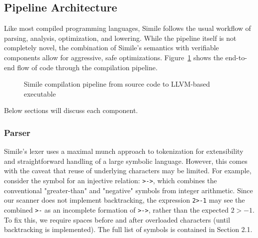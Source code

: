 \subsection{Pipeline Architecture}
Like most compiled programming languages, Simile follows the usual workflow of parsing, analysis, optimization, and lowering. While the pipeline itself is not completely novel, the combination of Simile's semantics with verifiable components allow for aggressive, safe optimizations. Figure~\ref{fig:pipeline} shows the end-to-end flow of code through the compilation pipeline.

\begin{figure}[H]
  \centering
  \caption{Simile compilation pipeline from source code to LLVM-based executable}
  \label{fig:pipeline}
\end{figure}

Below sections will discuss each component.

\subsubsection{Parser}
Simile's lexer uses a maximal munch approach to tokenization for extensibility and straightforward handling of a large symbolic language. However, this comes with the caveat that reuse of underlying characters may be limited. For example, consider the symbol for an injective relation: \texttt{>->}, which combines the conventional "greater-than" and "negative" symbols from integer arithmetic. Since our scanner does not implement backtracking, the expression \texttt{2>-1} may see the combined \texttt{>-} as an incomplete formation of \texttt{>->}, rather than the expected $2 > -1$. To fix this, we require spaces before and after overloaded characters (until backtracking is implemented). The full list of symbols is contained in Section 2.1.

